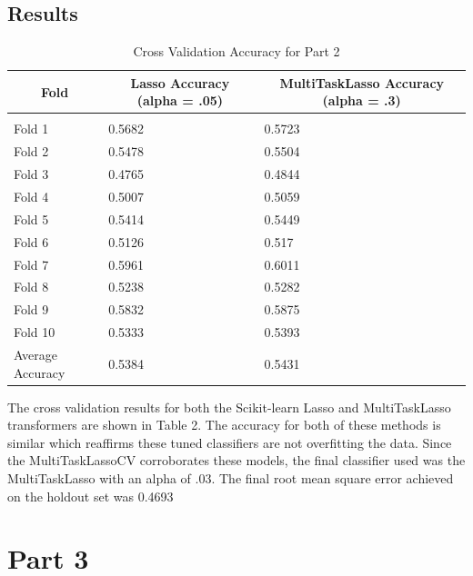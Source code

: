 \documentclass{article} %
\begin{document}
\subsection{Results}

\begin{table}[h]
\caption{Cross Validation Accuracy for Part 2}
\label{classtable}
\begin{center}
	\begin{tabular}{lll}
		\multicolumn{1}{c}{\bf Fold}   &\multicolumn{1}{c}{\bf Lasso Accuracy (alpha = .05)} &\multicolumn{1}{c}{\bf MultiTaskLasso Accuracy (alpha = .3)}
		\\ \hline \\
		Fold 1   &0.5682 &0.5723\\
		Fold 2   &0.5478 &0.5504\\
		Fold 3   &0.4765 &0.4844\\
		Fold 4   &0.5007 &0.5059  \\
		Fold 5   &0.5414 &0.5449  \\
		Fold 6   &0.5126 &0.517  \\
		Fold 7   &0.5961 &0.6011\\
		Fold 8   &0.5238 &0.5282\\
		Fold 9   &0.5832 &0.5875\\
		Fold 10   &0.5333 &0.5393 \\
		Average Accuracy   &0.5384 & 0.5431\\
	\end{tabular}
\end{center}
\end{table} 

The cross validation results for both the Scikit-learn Lasso and MultiTaskLasso transformers are shown in Table 2. The accuracy for both of these methods is similar which reaffirms these tuned classifiers are not overfitting the data. Since the MultiTaskLassoCV corroborates these models, the final classifier used was the MultiTaskLasso with an alpha of .03.
The final root mean square error achieved on the holdout set was 0.4693


\section{Part 3}
\end{document}
